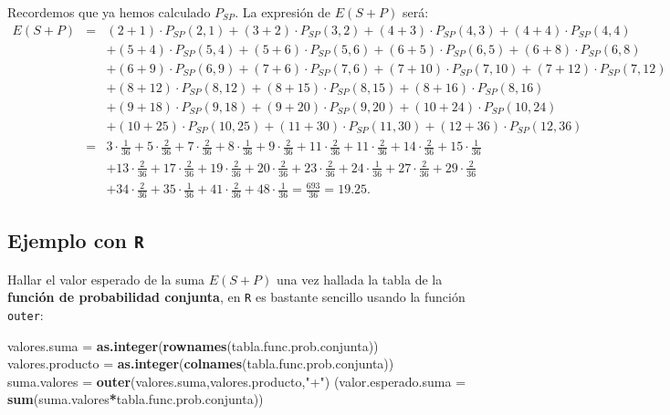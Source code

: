 \documentclass[]{book}
\newenvironment{Shaded}{\begin{snugshade}}{\end{snugshade}}
\newcommand{\DataTypeTok}[1]{\textcolor[rgb]{0.13,0.29,0.53}{#1}}
\newcommand{\KeywordTok}[1]{\textcolor[rgb]{0.13,0.29,0.53}{\textbf{#1}}}
\newcommand{\NormalTok}[1]{#1}
\newcommand{\OperatorTok}[1]{\textcolor[rgb]{0.81,0.36,0.00}{\textbf{#1}}}
\newcommand{\StringTok}[1]{\textcolor[rgb]{0.31,0.60,0.02}{#1}}
\begin{document}
Recordemos que ya hemos calculado \(P_{SP}\). La expresión de \(E(S+P)\) será:
\[
\begin{array}{rll}
E(S+P) & = &(2+1)\cdot P_{SP}(2,1)+(3+2)\cdot P_{SP}(3,2)+(4+3)\cdot P_{SP}(4,3)+(4+4)\cdot P_{SP}(4,4)\\ & &
+ (5+4)\cdot P_{SP}(5,4)+(5+6)\cdot P_{SP}(5,6)+(6+5)\cdot P_{SP}(6,5)+(6+8)\cdot P_{SP}(6,8)\\ & & 
+ (6+9)\cdot P_{SP}(6,9)+(7+6)\cdot P_{SP}(7,6)+(7+10)\cdot P_{SP}(7,10)+(7+12)\cdot P_{SP}(7,12)\\ & & 
+ (8+12)\cdot P_{SP}(8,12)+(8+15)\cdot P_{SP}(8,15)+(8+16)\cdot P_{SP}(8,16)\\ & & +(9+18)\cdot P_{SP}(9,18)
+ (9+20)\cdot P_{SP}(9,20)+(10+24)\cdot P_{SP}(10,24)\\ & & +(10+25)\cdot P_{SP}(10,25)+(11+30)\cdot P_{SP}(11,30) 
+ (12+36)\cdot P_{SP}(12,36) \\ & = & 3\cdot \frac{1}{36}+5\cdot\frac{2}{36}+7\cdot \frac{2}{36}+8\cdot \frac{1}{36}+9\cdot \frac{2}{36}+11\cdot\frac{2}{36}+11\cdot \frac{2}{36}+14\cdot\frac{2}{36}+15\cdot\frac{1}{36}\\ & & 
+ 13\cdot\frac{2}{36}+17\cdot\frac{2}{36}+19\cdot\frac{2}{36}+20\cdot\frac{2}{36}+23\cdot\frac{2}{36}+24\cdot\frac{1}{36}+27\cdot\frac{2}{36}+29\cdot\frac{2}{36} \\ & & 
+ 34\cdot\frac{2}{36}+35\cdot\frac{1}{36}+41\cdot\frac{2}{36}+48\cdot\frac{1}{36}=\frac{693}{36}= 19.25.
\end{array}
\]

\hypertarget{ejemplo-con-r-5}{%
\subsection{\texorpdfstring{Ejemplo con \texttt{R}}{Ejemplo con R}}\label{ejemplo-con-r-5}}

Hallar el valor esperado de la suma \(E(S+P)\) una vez hallada la tabla de la \textbf{función de probabilidad conjunta}, en \texttt{R} es bastante sencillo usando la función \texttt{outer}:

\begin{Shaded}
\begin{Highlighting}[]
\NormalTok{valores.suma =}\StringTok{ }\KeywordTok{as.integer}\NormalTok{(}\KeywordTok{rownames}\NormalTok{(tabla.func.prob.conjunta))}
\NormalTok{valores.producto =}\StringTok{ }\KeywordTok{as.integer}\NormalTok{(}\KeywordTok{colnames}\NormalTok{(tabla.func.prob.conjunta))}
\NormalTok{suma.valores =}\StringTok{ }\KeywordTok{outer}\NormalTok{(valores.suma,valores.producto,}\StringTok{"+"}\NormalTok{)}
\NormalTok{(}\DataTypeTok{valor.esperado.suma =} \KeywordTok{sum}\NormalTok{(suma.valores}\OperatorTok{*}\NormalTok{tabla.func.prob.conjunta))}
\end{Highlighting}
\end{Shaded}
\end{document}
